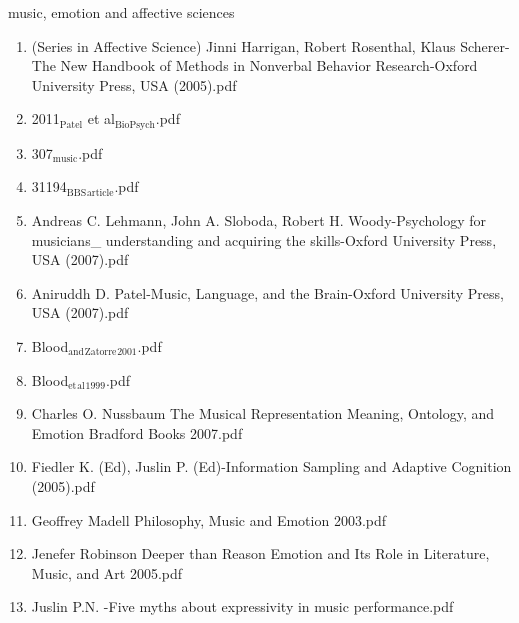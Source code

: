 \documentclass[11pt]{article}
\begin{document}
\item music, emotion and affective sciences
\label{sec-1-1-1-1-30}
\begin{enumerate}
\item (Series in Affective Science) Jinni Harrigan, Robert Rosenthal, Klaus Scherer-The New Handbook of Methods in Nonverbal Behavior Research-Oxford University Press, USA (2005).pdf
\label{sec-1-1-1-1-30-1}

\item 2011$_{\text{Patel}}$ et al$_{\text{BioPsych}}$.pdf
\label{sec-1-1-1-1-30-2}

\item 307$_{\text{music}}$.pdf
\label{sec-1-1-1-1-30-3}

\item 31194$_{\text{BBS}}$$_{\text{article}}$.pdf
\label{sec-1-1-1-1-30-4}

\item Andreas C. Lehmann, John A. Sloboda, Robert H. Woody-Psychology for musicians\_ understanding and acquiring the skills-Oxford University Press, USA (2007).pdf
\label{sec-1-1-1-1-30-5}

\item Aniruddh D. Patel-Music, Language, and the Brain-Oxford University Press, USA (2007).pdf
\label{sec-1-1-1-1-30-6}

\item Blood$_{\text{and}}$$_{\text{Zatorre}}$$_{\text{2001}}$.pdf
\label{sec-1-1-1-1-30-7}

\item Blood$_{\text{et}}$$_{\text{al}}$$_{\text{1999}}$.pdf
\label{sec-1-1-1-1-30-8}

\item Charles O. Nussbaum The Musical Representation Meaning, Ontology, and Emotion Bradford Books  2007.pdf
\label{sec-1-1-1-1-30-9}

\item Fiedler K. (Ed), Juslin P. (Ed)-Information Sampling and Adaptive Cognition (2005).pdf
\label{sec-1-1-1-1-30-10}

\item Geoffrey Madell Philosophy, Music and Emotion  2003.pdf
\label{sec-1-1-1-1-30-11}

\item Jenefer Robinson Deeper than Reason Emotion and Its Role in Literature, Music, and Art  2005.pdf
\label{sec-1-1-1-1-30-12}

\item Juslin P.N. -Five myths about expressivity in music performance.pdf
\label{sec-1-1-1-1-30-13}


\end{enumerate}
\end{document}
